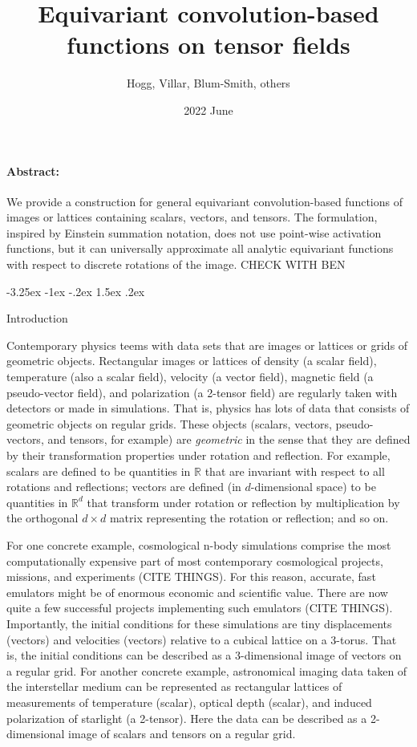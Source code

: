 \documentclass{article}
\title{\bfseries%
Equivariant convolution-based functions
on tensor fields}
\author{Hogg, Villar, Blum-Smith, others}
\date{2022 June}
\makeatletter
\theoremstyle{plain}
\renewcommand\section{\@startsection {section}{1}{\z@}%
  {-3.25ex \@plus -1ex \@minus -.2ex}%
  {1.5ex \@plus .2ex}%
  {\raggedright\normalfont\large\bfseries}}
\makeatother
\begin{document}
\maketitle\thispagestyle{empty}

\paragraph{Abstract:} We provide a construction for general equivariant convolution-based functions of images or lattices
containing scalars, vectors, and tensors. The formulation, inspired by Einstein summation notation, does not use point-wise activation functions, but it can universally approximate all analytic equivariant functions with respect to discrete rotations of the image. CHECK WITH BEN

\section{Introduction}

Contemporary physics teems with data sets that are images or lattices or grids of geometric objects.
Rectangular images or lattices of density (a scalar field), temperature (also a scalar field), velocity (a vector field), magnetic field (a pseudo-vector field), and polarization (a 2-tensor field) are regularly taken with detectors or made in simulations.
That is, physics has lots of data that consists of geometric objects on regular grids.
These objects (scalars, vectors, pseudo-vectors, and tensors, for example) are \emph{geometric} in the sense that they are defined by their transformation properties under rotation and reflection.
For example, scalars are defined to be quantities in $\mathbb R$ that are invariant with respect to all rotations and reflections; vectors are defined (in $d$-dimensional space) to be quantities in $\mathbb R^d$ that transform under rotation or reflection by multiplication by the orthogonal $d\times d$ matrix representing the rotation or reflection; and so on.

For one concrete example, cosmological n-body simulations comprise the most computationally expensive part of most contemporary cosmological projects, missions, and experiments (CITE THINGS).
For this reason, accurate, fast emulators might be of enormous economic and scientific value.
There are now quite a few successful projects implementing such emulators (CITE THINGS).
Importantly, the initial conditions for these simulations are tiny displacements (vectors) and velocities (vectors) relative to a cubical lattice on a 3-torus.
That is, the initial conditions can be described as a 3-dimensional image of vectors on a regular grid.
For another concrete example, astronomical imaging data taken of the interstellar medium can be represented as rectangular lattices of measurements of temperature (scalar), optical depth (scalar), and induced polarization of starlight (a 2-tensor).
Here the data can be described as a 2-dimensional image of scalars and tensors on a regular grid.
\end{document}
